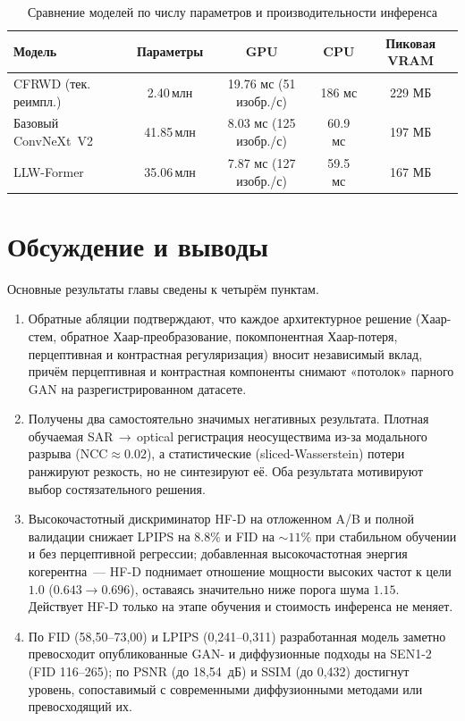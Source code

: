 \begin{table}[H]
  \caption{Сравнение моделей по числу параметров и производительности инференса}
  \label{tab:models_perf}
  \centering
  \small
  \begin{tabular}{lcccc}
    \toprule
    Модель & Параметры & GPU & CPU & Пиковая VRAM \\
    \midrule
    CFRWD (тек. реимпл.) & 2.40\,млн  & 19.76 мс (51 изобр./с)  & 186 мс & 229 МБ \\
    Базовый ConvNeXt~V2     & 41.85\,млн & 8.03 мс (125 изобр./с)  & 60.9 мс               & 197 МБ           \\
    LLW-Former  & 35.06\,млн & 7.87 мс (127 изобр./с)  & 59.5 мс               & 167 МБ           \\
    \bottomrule
  \end{tabular}
\end{table}

\section{Обсуждение и выводы}
\label{sec:concl}

Основные результаты главы сведены к четырём пунктам.

\begin{enumerate}[leftmargin=2.0em,itemsep=0.3em,topsep=0.3em]
  \item Обратные абляции подтверждают, что каждое архитектурное решение
        (Хаар-стем, обратное Хаар-преобразование, покомпонентная Хаар-потеря,
        перцептивная и контрастная регуляризация) вносит независимый вклад, причём
        перцептивная и контрастная компоненты снимают «потолок» парного GAN
        на разрегистрированном датасете.
  \item Получены два самостоятельно значимых негативных результата. Плотная
        обучаемая SAR\,$\to$\,optical регистрация неосуществима из-за модального
        разрыва ($\mathrm{NCC}\approx 0.02$), а статистические (sliced-Wasserstein)
        потери ранжируют резкость, но не синтезируют её. Оба результата мотивируют
        выбор состязательного решения.
  \item Высокочастотный дискриминатор HF-D на отложенном A/B и полной валидации
        снижает LPIPS на $8.8\%$ и FID на $\sim 11\%$ при стабильном обучении и без
        перцептивной регрессии; добавленная высокочастотная энергия когерентна~---
        HF-D поднимает отношение мощности высоких частот к цели $1.0$
        ($0.643\to0.696$), оставаясь значительно ниже порога шума $1.15$.
        Действует HF-D только на этапе обучения и стоимость инференса не меняет.
  \item По FID (58,50--73,00) и LPIPS (0,241--0,311) разработанная модель заметно
        превосходит опубликованные GAN- и диффузионные подходы на SEN1-2 (FID
        116--265); по PSNR (до 18,54~дБ) и SSIM (до 0,432) достигнут уровень,
        сопоставимый с современными диффузионными методами или превосходящий их.
\end{enumerate}

\newpage
